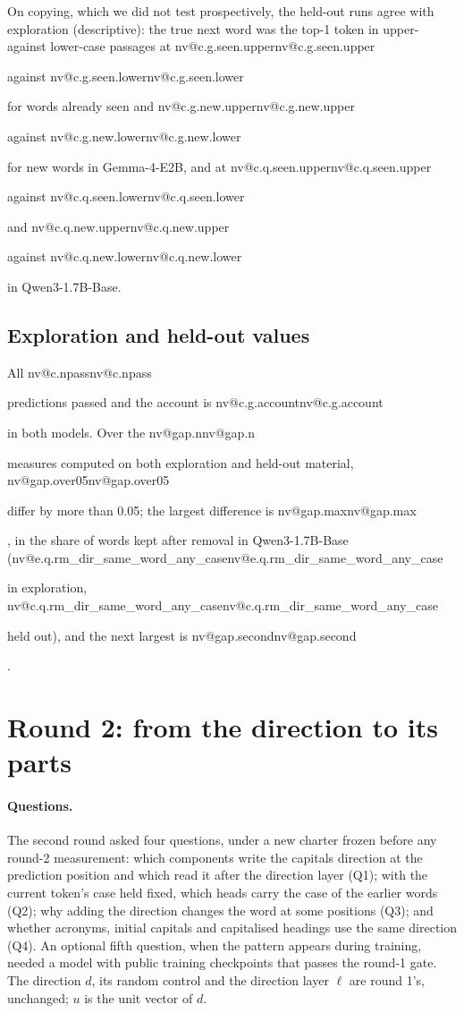 \documentclass[11pt]{article}
\makeatletter
\newcommand{\nv}[1]{\ifcsname nv@#1\endcsname\csname nv@#1\endcsname\else\PackageError{numbers}{Unknown number key #1}{}\fi}
\newcommand{\G}[1]{\nv{c.g.#1}}
\newcommand{\Q}[1]{\nv{c.q.#1}}
\newcommand{\EQ}[1]{\nv{e.q.#1}}
\newcommand{\gm}{Gemma-4-E2B}
\newcommand{\qw}{Qwen3-1.7B-Base}
\makeatother
\begin{document}
On copying, which we did not test prospectively, the held-out runs agree with exploration (descriptive): the true next word was the top-1 token in upper- against lower-case passages at \G{seen.upper} against \G{seen.lower} for words already seen and \G{new.upper} against \G{new.lower} for new words in \gm{}, and at \Q{seen.upper} against \Q{seen.lower} and \Q{new.upper} against \Q{new.lower} in \qw{}.

\subsection{Exploration and held-out values}

All \nv{c.npass} predictions passed and the account is \G{account} in both models. Over the \nv{gap.n} measures computed on both exploration and held-out material, \nv{gap.over05} differ by more than 0.05; the largest difference is \nv{gap.max}, in the share of words kept after removal in \qw{} (\EQ{rm_dir_same_word_any_case} in exploration, \Q{rm_dir_same_word_any_case} held out), and the next largest is \nv{gap.second}.

\section{Round 2: from the direction to its parts}
\label{sec:round2}

\paragraph{Questions.} The second round asked four questions, under a new charter frozen before any round-2 measurement: which components write the capitals direction at the prediction position and which read it after the direction layer (Q1); with the current token's case held fixed, which heads carry the case of the earlier words (Q2); why adding the direction changes the word at some positions (Q3); and whether acronyms, initial capitals and capitalised headings use the same direction (Q4). An optional fifth question, when the pattern appears during training, needed a model with public training checkpoints that passes the round-1 gate. The direction $d$, its random control and the direction layer $\ell$ are round 1's, unchanged; $u$ is the unit vector of $d$.
\end{document}
